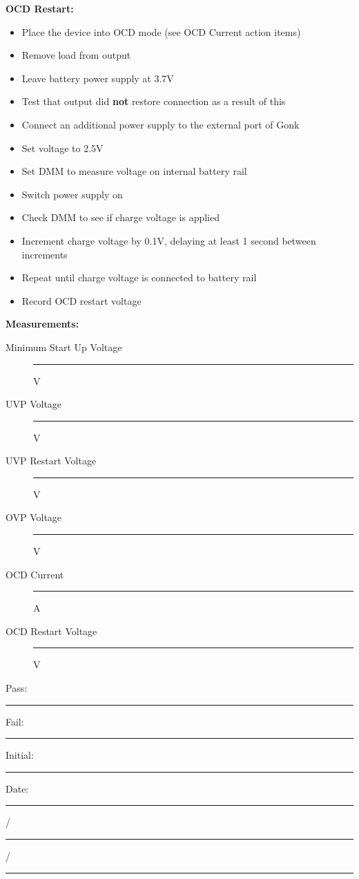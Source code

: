 {\Large \textbf{OCD Restart:}}
\begin{itemize}
\item Place the device into OCD mode (see OCD Current action items)
\item Remove load from output
\item Leave battery power supply at 3.7V
\item Test that output did \textbf{not} restore connection as a result of this
\item Connect an additional power supply to the external port of Gonk
\item Set voltage to 2.5V
\item Set DMM to measure voltage on internal battery rail 
\item Switch power supply on
\item Check DMM to see if charge voltage is applied 
\item Increment charge voltage by 0.1V, delaying at least 1 second between increments
\item Repeat until charge voltage is connected to battery rail
\item Record OCD restart voltage 
\end{itemize}

{\Large \textbf{Measurements:}}
\begin{description}
\item [Minimum Start Up Voltage] \rule{1.5cm}{0.15mm} V
\item [UVP Voltage] \rule{1.5cm}{0.15mm} V
\item [UVP Restart Voltage] \rule{1.5cm}{0.15mm} V
\item [OVP Voltage] \rule{1.5cm}{0.15mm} V
\item [OCD Current] \rule{1.5cm}{0.15mm} A
\item [OCD Restart Voltage] \rule{1.5cm}{0.15mm} V
\end{description}


\vfill
{\large Pass: \rule{1cm}{0.15mm} \hspace{1cm} Fail: \rule{1cm}{0.15mm}} \hfill Initial: \rule{2cm}{0.15mm} \hspace{1cm} Date: \rule{0.5cm}{0.15mm}/\rule{0.5cm}{0.15mm}/\rule{1cm}{0.15mm}\\[5pt]

\pagebreak


